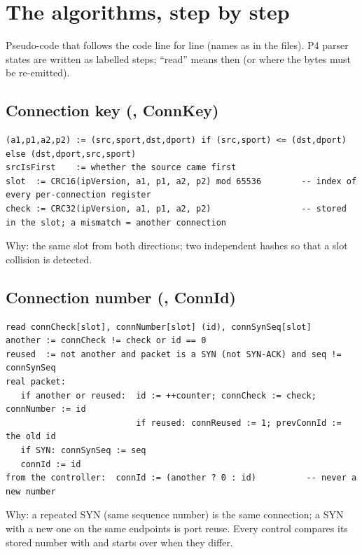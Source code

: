 \section{The algorithms, step by step}
\label{sec:algos}

Pseudo-code that follows the code line for line (names as in the files). P4 parser states are written as labelled
steps; ``read'' means  then  (or  where the bytes must be re-emitted).


\subsection{Connection key (, ConnKey)}
\begin{Verbatim}
(a1,p1,a2,p2) := (src,sport,dst,dport) if (src,sport) <= (dst,dport) else (dst,dport,src,sport)
srcIsFirst    := whether the source came first
slot  := CRC16(ipVersion, a1, p1, a2, p2) mod 65536        -- index of every per-connection register
check := CRC32(ipVersion, a1, p1, a2, p2)                  -- stored in the slot; a mismatch = another connection
\end{Verbatim}
Why: the same slot from both directions; two independent hashes so that a slot collision is detected.

\subsection{Connection number (, ConnId)}
\begin{Verbatim}
read connCheck[slot], connNumber[slot] (id), connSynSeq[slot]
another := connCheck != check or id == 0
reused  := not another and packet is a SYN (not SYN-ACK) and seq != connSynSeq
real packet:
   if another or reused:  id := ++counter; connCheck := check; connNumber := id
                          if reused: connReused := 1; prevConnId := the old id
   if SYN: connSynSeq := seq
   connId := id
from the controller:  connId := (another ? 0 : id)          -- never a new number
\end{Verbatim}
Why: a repeated SYN (same sequence number) is the same connection; a SYN with a new one on the same endpoints is
port reuse. Every control compares its stored number with  and starts over when they differ.

